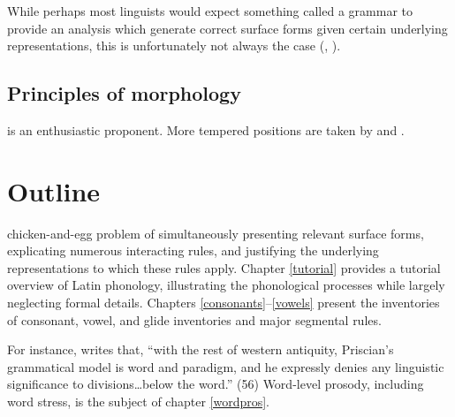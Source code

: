 While perhaps most linguists would expect something called a grammar to provide an analysis which generate correct surface forms given certain underlying representations, this is unfortunately not always the case (\citealp[19]{Bauer2001}, \citealp[23]{Hall1997}).

\subsection{Principles of morphology}

\citet{Matthews1972a} is an enthusiastic proponent.
More tempered positions are taken by \citet{Lieber1980} and \citet{Aronoff1994}.

\section{Outline}


chicken-and-egg problem of simultaneously 
presenting relevant surface forms, explicating numerous interacting rules, and justifying the underlying representations to which these rules apply.
Chapter \ref{tutorial} provides a tutorial overview of Latin phonology, illustrating the phonological processes while largely neglecting formal details.
Chapters \ref{consonants}--\ref{vowels} present the inventories of consonant, vowel, and glide inventories and major segmental rules.











For instance, \citet{Robins1979} writes that, ``with the rest of western antiquity, Priscian's grammatical model is word and paradigm, and he expressly denies any linguistic significance to divisions\ldots{}below the word.'' (56)
Word-level prosody, including word stress, is the subject of chapter \ref{wordpros}.
